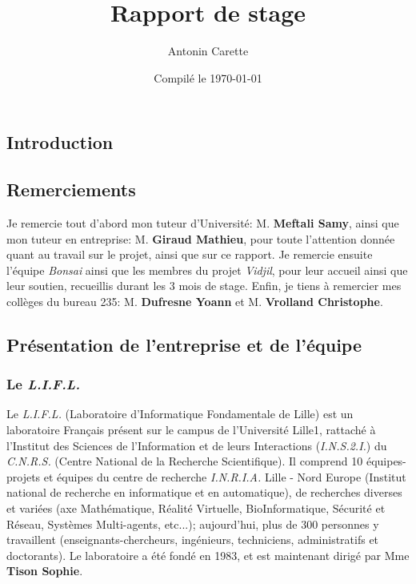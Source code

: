 \documentclass[12pt]{report}
\title{Rapport de stage}
\author{Antonin Carette}
\date{Compilé le \today}
\begin{document}
\begin{spacing}{1.2}

\maketitle

\tableofcontents

\chapter*{Introduction}


\section{Remerciements}
Je remercie tout d'abord mon tuteur d'Université: M. \textbf{Meftali Samy}, ainsi que mon tuteur en entreprise: M. \textbf{Giraud Mathieu}, pour toute l'attention donnée quant au travail sur le projet, ainsi que sur ce rapport.
\newline
Je remercie ensuite l'équipe \textit{Bonsai} ainsi que les membres du projet \textit{Vidjil}, pour leur accueil ainsi que leur soutien, recueillis durant les 3 mois de stage.
\newline
Enfin, je tiens à remercier mes collèges du bureau 235: M. \textbf{Dufresne Yoann} et M. \textbf{Vrolland Christophe}.

\section{Présentation de l'entreprise et de l'équipe}

\subsection{Le \textit{L.I.F.L.}}
Le \textit{L.I.F.L.} (Laboratoire d'Informatique Fondamentale de Lille) est un laboratoire Français présent sur le campus de l'Université Lille1, rattaché à l'Institut des Sciences de l'Information et de leurs Interactions (\textit{I.N.S.2.I.}) du \textit{C.N.R.S.} (Centre National de la Recherche Scientifique).
\newline
Il comprend 10 équipes-projets et équipes du centre de recherche \textit{I.N.R.I.A.} Lille - Nord Europe (Institut national de recherche en informatique et en automatique), de recherches diverses et variées (axe Mathématique, Réalité Virtuelle, BioInformatique, Sécurité et Réseau, Systèmes Multi-agents, etc...); aujourd'hui, plus de 300 personnes y travaillent (enseignants-chercheurs, ingénieurs, techniciens, administratifs et doctorants).
\newline
Le laboratoire a été fondé en 1983, et est maintenant dirigé par Mme \textbf{Tison Sophie}.


\end{spacing}
\end{document}
